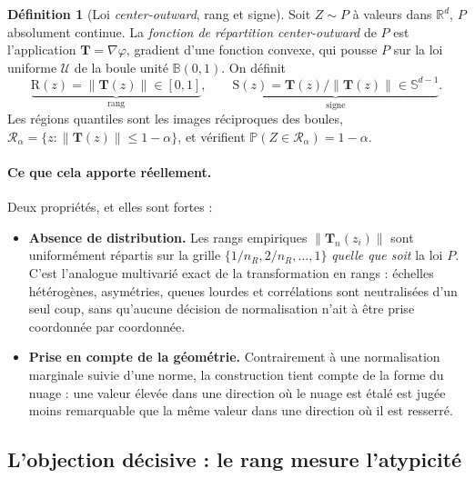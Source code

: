 \documentclass[11pt,a4paper]{article}
\theoremstyle{definition}
\newtheorem{definition}{Définition}[section]
\theoremstyle{remark}
\newcommand{\R}{\mathbb{R}}
\newcommand{\PP}{\mathbb{P}}
\newcommand{\Unif}{\mathcal{U}}
\newcommand{\Bball}{\mathbb{B}}
\newcommand{\Sphere}{\mathbb{S}}
\newcommand{\norm}[1]{\left\lVert #1 \right\rVert}
\newcommand{\Tmap}{\mathbf{T}}
\begin{document}
\bigskip

\begin{definition}[Loi \emph{center-outward}, rang et signe]
  \label{def:co}
  Soit $Z \sim P$ à valeurs dans $\R^d$, $P$ absolument continue. La \emph{fonction de répartition
  center-outward} de $P$ est l'application $\Tmap = \nabla\varphi$, gradient d'une fonction convexe,
  qui pousse $P$ sur la loi uniforme $\Unif$ de la boule unité $\Bball(0,1)$. On définit
  \[
  \underbrace{\mathrm{R}(z) = \norm{\Tmap(z)} \in [0,1]}_{\text{rang}},
  \qquad
  \underbrace{\mathrm{S}(z) = \Tmap(z)/\norm{\Tmap(z)} \in \Sphere^{d-1}}_{\text{signe}}.
  \]
  Les régions quantiles sont les images réciproques des boules,
  $\mathcal{R}_\alpha = \{z : \norm{\Tmap(z)} \le 1-\alpha\}$, et vérifient
  $\PP(Z \in \mathcal{R}_\alpha) = 1-\alpha$.
\end{definition}

\bigskip

\paragraph{Ce que cela apporte réellement.} Deux propriétés, et elles sont fortes :

\medskip

\begin{itemize}[nosep,leftmargin=1.4em]
  \item \textbf{Absence de distribution.} Les rangs empiriques $\norm{\Tmap_n(z_i)}$ sont
  uniformément répartis sur la grille $\{1/n_R, 2/n_R,\dots,1\}$ \emph{quelle que soit} la loi
  $P$. C'est l'analogue multivarié exact de la transformation en rangs : échelles hétérogènes,
  asymétries, queues lourdes et corrélations sont neutralisées d'un seul coup, sans qu'aucune
  décision de normalisation n'ait à être prise coordonnée par coordonnée.
  \item \textbf{Prise en compte de la géométrie.} Contrairement à une normalisation marginale
  suivie d'une norme, la construction tient compte de la forme du nuage : une valeur élevée dans
  une direction où le nuage est étalé est jugée moins remarquable que la même valeur dans une
  direction où il est resserré.
\end{itemize}

\bigskip

\subsection{L'objection décisive : le rang mesure l'atypicité}
\label{sec:objection}
\end{document}
